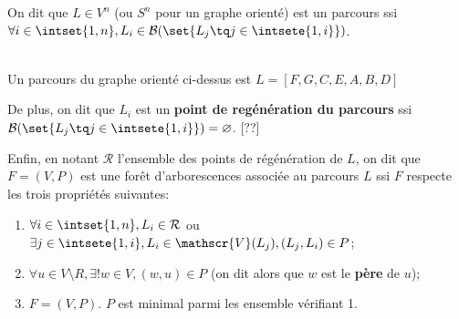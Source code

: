 \documentclass{scrartcl}
\begin{document}
			On dit que $L\in V^n$ (ou $S^n$ pour un graphe orienté) est un parcours ssi $\forall i \in \intset{1,n}, L_i \in \mathcal{B}(\set{L_j \tq j \in \intsete{1,i}})$.
			
			\begin{center}	
			 \\
			Un parcours du graphe orienté ci-dessus est $L = [F,G,C,E,A,B,D]$
			\end{center}
			

			De plus, on dit que $L_i$ est un \textbf{point de regénération du parcours} 
			ssi $\mathcal{B}(\set{L_j \tq j \in \intsete{1,i}}) = \varnothing$. [??]

			Enfin, en notant $\mathcal{R}$ l'ensemble des points de régénération de $L$,
			on dit que $F = (V,P)$ est une forêt d'arborescences associée au parcours $L$ ssi $F$ respecte les trois propriétés suivantes:
			\begin{enumerate}
				\item $\forall i \in \intset{1,n}, L_i \in \mathcal{R}$ ou $\exists j \in \intsete{1,i}, L_i \in \mathscr{V}(L_j), (L_j,L_i) \in P$;
				\item $\forall u \in V \setminus R, \exists! w \in V, (w,u) \in P$ (on dit alors que $w$ est le \textbf{père} de $u$);
				\item $F = (V,P)$. $P$ est minimal parmi les ensemble vérifiant 1.
			\end{enumerate}
\end{document}
